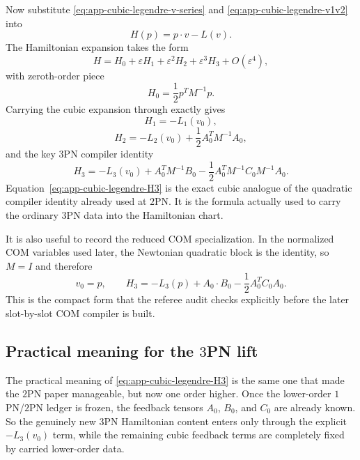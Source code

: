 \documentclass[11pt]{article}
\begin{document}
Now substitute \eqref{eq:app-cubic-legendre-v-series} and
\eqref{eq:app-cubic-legendre-v1v2} into
\begin{equation}
H(p)=p\cdot v-L(v).
\label{eq:app-cubic-legendre-H-def}
\end{equation}
The Hamiltonian expansion takes the form
\begin{equation}
H=H_0+\varepsilon H_1+\varepsilon^2H_2+\varepsilon^3H_3+O(\varepsilon^4),
\label{eq:app-cubic-legendre-H-series}
\end{equation}
with zeroth-order piece
\begin{equation}
H_0=\frac12 p^TM^{-1}p.
\label{eq:app-cubic-legendre-H0}
\end{equation}
Carrying the cubic expansion through exactly gives
\begin{equation}
H_1=-L_1(v_0),
\label{eq:app-cubic-legendre-H1}
\end{equation}
\begin{equation}
H_2=-L_2(v_0)+\frac12A_0^TM^{-1}A_0,
\label{eq:app-cubic-legendre-H2}
\end{equation}
and the key $3$PN compiler identity
\begin{equation}
\boxed{
H_3=-L_3(v_0)+A_0^TM^{-1}B_0-
\frac12A_0^TM^{-1}C_0M^{-1}A_0.
}
\label{eq:app-cubic-legendre-H3}
\end{equation}
Equation~\eqref{eq:app-cubic-legendre-H3} is the exact cubic analogue of the
quadratic compiler identity already used at $2$PN.  It is the formula actually
used to carry the ordinary $3$PN data into the Hamiltonian chart.

It is also useful to record the reduced COM specialization.  In the normalized
COM variables used later, the Newtonian quadratic block is the identity, so
\(M=I\) and therefore
\begin{equation}
v_0=p,
\qquad
H_3=-L_3(p)+A_0\cdot B_0-\frac12A_0^TC_0A_0.
\label{eq:app-cubic-legendre-H3-com}
\end{equation}
This is the compact form that the referee audit checks explicitly before the
later slot-by-slot COM compiler is built.

\subsection{Practical meaning for the \texorpdfstring{$3$}{3}PN lift}
\label{app:cubic-legendre-meaning}

The practical meaning of \eqref{eq:app-cubic-legendre-H3} is the same one that
made the $2$PN paper manageable, but now one order higher.  Once the lower-order
$1$PN/$2$PN ledger is frozen, the feedback tensors \(A_0\), \(B_0\), and
\(C_0\) are already known.  So the genuinely new $3$PN Hamiltonian content
enters only through the explicit \(-L_3(v_0)\) term, while the remaining cubic
feedback terms are completely fixed by carried lower-order data.
\end{document}
